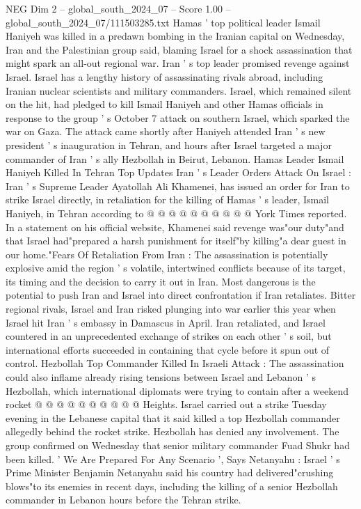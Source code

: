 \begin{textsample}{NEG Dim 2 – global\_south\_2024\_07 – Score 1.00 – global\_south\_2024\_07/111503285.txt}  \label{ex:f2_neg_279}
Hamas ' top political leader Ismail Haniyeh was killed in a predawn bombing in the Iranian capital on Wednesday, Iran and the Palestinian group said, blaming Israel for a shock assassination that might spark an all-out regional war.
Iran ' s top leader promised revenge against Israel.
Israel has a lengthy history of assassinating rivals abroad, including Iranian nuclear scientists and military commanders.
Israel, which remained silent on the hit, had pledged to kill Ismail Haniyeh and other Hamas officials in response to the group ' s October 7 attack on southern Israel, which sparked the war on Gaza.
The attack came shortly after Haniyeh attended Iran ' s new president ' s inauguration in Tehran, and hours after Israel targeted a major commander of Iran ' s ally Hezbollah in Beirut, Lebanon.
Hamas Leader Ismail Haniyeh Killed In Tehran Top Updates Iran ' s Leader Orders Attack On Israel : Iran ' s Supreme Leader Ayatollah Ali Khamenei, has issued an order for Iran to strike Israel directly, in retaliation for the killing of Hamas ' s leader, Ismail Haniyeh, in Tehran according to @ @ @ @ @ @ @ @ @ @ York Times reported.
In a statement on his official website, Khamenei said revenge was"our duty"and that Israel had"prepared a harsh punishment for itself"by killing"a dear guest in our home."Fears Of Retaliation From Iran : The assassination is potentially explosive amid the region ' s volatile, intertwined conflicts because of its target, its timing and the decision to carry it out in Iran.
Most dangerous is the potential to push Iran and Israel into direct confrontation if Iran retaliates.
Bitter regional rivals, Israel and Iran risked plunging into war earlier this year when Israel hit Iran ' s embassy in Damascus in April.
Iran retaliated, and Israel countered in an unprecedented exchange of strikes on each other ' s soil, but international efforts succeeded in containing that cycle before it spun out of control.
Hezbollah Top Commander Killed In Israeli Attack : The assassination could also inflame already rising tensions between Israel and Lebanon ' s Hezbollah, which international diplomats were trying to contain after a weekend rocket @ @ @ @ @ @ @ @ @ @ Heights.
Israel carried out a strike Tuesday evening in the Lebanese capital that it said killed a top Hezbollah commander allegedly behind the rocket strike.
Hezbollah has denied any involvement.
The group confirmed on Wednesday that senior military commander Fuad Shukr had been killed. ' We Are Prepared For Any Scenario ', Says Netanyahu : Israel ' s Prime Minister Benjamin Netanyahu said his country had delivered"crushing blows"to its enemies in recent days, including the killing of a senior Hezbollah commander in Lebanon hours before the Tehran strike.

\end{textsample}
